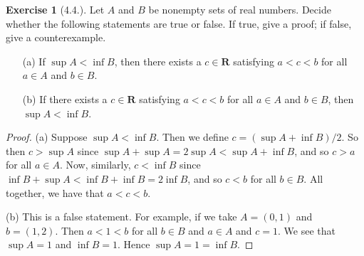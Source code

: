 \documentclass[9pt,reqno]{amsart}
\theoremstyle{definition}
\newtheorem{exercise}{Exercise}[section]
\newcommand{\rr}{\mathbf R}
\begin{document}
\begin{exercise}[4.4.] Let $A$ and $B$ be nonempty sets of real numbers. Decide whether the following statements are true or false. If true, give a proof; if false, give a counterexample.
\begin{itemize}
	\item[(a)] If $\sup A < \inf B$, then there exists a $c \in \rr$ satisfying $a<c<b$ for all $a \in A$ and $b \in B$.
	\item[(b)] If there exists a $c \in \rr$ satisfying $a<c<b$ for all $a \in A$ and $b \in B$, then $\sup A< \inf B$.
\end{itemize}
\end{exercise}
\begin{proof}
	(a) Suppose $\sup A < \inf B$. Then we define $c= (\sup A + \inf B)/2$. So then $c> \sup A$ since $\sup A + \sup A = 2 \sup A < \sup A + \inf B$, and so $c > a$ for all $a \in A$. Now, similarly, $c < \inf B$ since $\inf B + \sup A < \inf B + \inf B = 2 \inf B$, and so $c <b$ for all $b \in B$. All together, we have that $a < c < b$. 
	
	(b) This is a false statement. For example, if we take $A = (0, 1)$ and $b = (1, 2)$. Then $a < 1 < b$ for all $b \in B$ and $a \in A$ and $c = 1$. We see that $\sup A = 1$ and $\inf B = 1$. Hence $\sup A = 1 = \inf B$.  
\end{proof}
\end{document}
